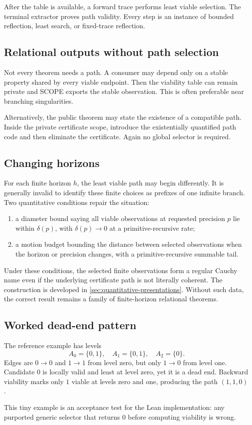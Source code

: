 After the table is available, a forward trace performs least viable selection.  The terminal extractor proves path validity.  Every step is an instance of bounded reflection, least search, or fixed-trace reflection.

\subsection{Relational outputs without path selection}

Not every theorem needs a path.  A consumer may depend only on a stable property shared by every viable endpoint.  Then the viability table can remain private and SCOPE exports the stable observation.  This is often preferable near branching singularities.

Alternatively, the public theorem may state the existence of a compatible path.  Inside the private certificate scope, introduce the existentially quantified path code and then eliminate the certificate.  Again no global selector is required.

\subsection{Changing horizons}

For each finite horizon \(h\), the least viable path may begin differently.  It is generally invalid to identify these finite choices as prefixes of one infinite branch.  Two quantitative conditions repair the situation:

\begin{enumerate}
\item a diameter bound saying all viable observations at requested precision \(p\) lie within \(\delta(p)\), with \(\delta(p)\to0\) at a primitive-recursive rate;
\item a motion budget bounding the distance between selected observations when the horizon or precision changes, with a primitive-recursive summable tail.
\end{enumerate}

Under these conditions, the selected finite observations form a regular Cauchy name even if the underlying certificate path is not literally coherent.  The construction is developed in \cref{sec:quantitative-presentations}.  Without such data, the correct result remains a family of finite-horizon relational theorems.

\subsection{Worked dead-end pattern}

The reference example has levels
\[
  A_0=\{0,1\},\quad A_1=\{0,1\},\quad A_2=\{0\}.
\]
Edges are \(0\to0\) and \(1\to1\) from level zero, but only \(1\to0\) from level one.  Candidate \(0\) is locally valid and least at level zero, yet it is a dead end.  Backward viability marks only \(1\) viable at levels zero and one, producing the path \((1,1,0)\).

This tiny example is an acceptance test for the Lean implementation: any purported generic selector that returns \(0\) before computing viability is wrong.
